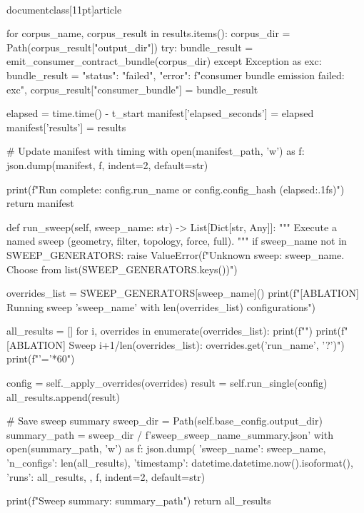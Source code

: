 \\documentclass[11pt]{article}
\begin{document}
\begin{CodeBlock}
        for corpus_name, corpus_result in results.items():
            corpus_dir = Path(corpus_result["output_dir"])
            try:
                bundle_result = emit_consumer_contract_bundle(corpus_dir)
            except Exception as exc:
                bundle_result = {
                    "status": "failed",
                    "error": f"consumer bundle emission failed: {exc}",
                }
            corpus_result["consumer_bundle"] = bundle_result

        elapsed = time.time() - t_start
        manifest['elapsed_seconds'] = elapsed
        manifest['results'] = results

        # Update manifest with timing
        with open(manifest_path, 'w') as f:
            json.dump(manifest, f, indent=2, default=str)

        print(f"\n[ABLATION] Run complete: {config.run_name or config.config_hash} ({elapsed:.1f}s)")
        return manifest

    def run_sweep(self, sweep_name: str) -> List[Dict[str, Any]]:
        """
        Execute a named sweep (geometry, filter, topology, force, full).
        """
        if sweep_name not in SWEEP_GENERATORS:
            raise ValueError(f"Unknown sweep: {sweep_name}. Choose from {list(SWEEP_GENERATORS.keys())}")

        overrides_list = SWEEP_GENERATORS[sweep_name]()
        print(f"[ABLATION] Running sweep '{sweep_name}' with {len(overrides_list)} configurations")

        all_results = []
        for i, overrides in enumerate(overrides_list):
            print(f"")
            print(f"[ABLATION] Sweep {i+1}/{len(overrides_list)}: {overrides.get('run_name', '?')}")
            print(f"{'='*60}")

            config = self._apply_overrides(overrides)
            result = self.run_single(config)
            all_results.append(result)

        # Save sweep summary
        sweep_dir = Path(self.base_config.output_dir)
        summary_path = sweep_dir / f'sweep_{sweep_name}_summary.json'
        with open(summary_path, 'w') as f:
            json.dump({
                'sweep_name': sweep_name,
                'n_configs': len(all_results),
                'timestamp': datetime.datetime.now().isoformat(),
                'runs': all_results,
            }, f, indent=2, default=str)

        print(f"\n[ABLATION] Sweep summary: {summary_path}")
        return all_results


\end{CodeBlock}
\end{document}

